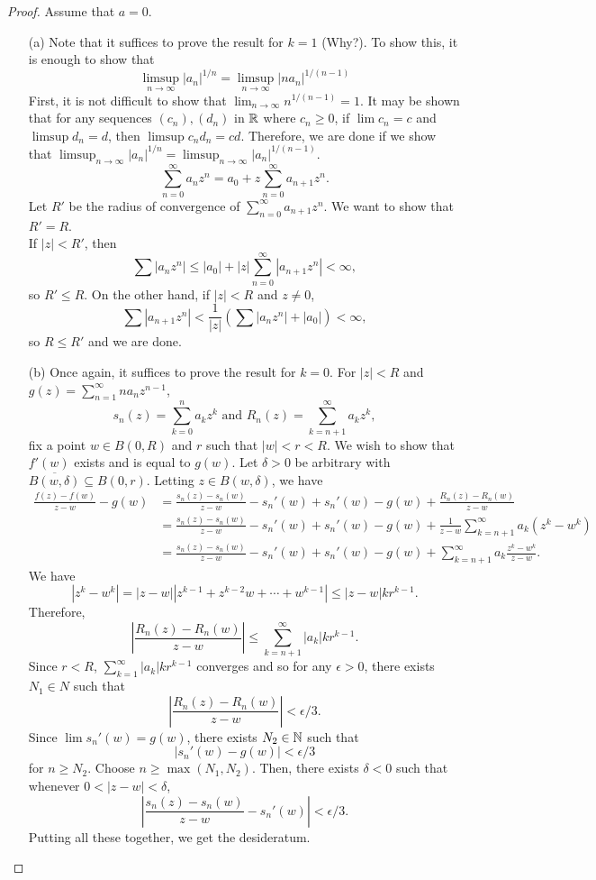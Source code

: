 	\begin{proof}
		Assume that $a = 0$.
		\begin{itemize}
			\item[(a)] Note that it suffices to prove the result for $k = 1$ (Why?). To show this, it is enough to show that
			\[ \limsup_{n\to\infty} |a_n|^{1/n} = \limsup_{n\to\infty} |na_n|^{1/(n-1)} \]
			First, it is not difficult to show that $\lim_{n\to\infty} n^{1/(n-1)} = 1$. It may be shown that for any sequences $(c_n),(d_n)$ in $\mathbb{R}$ where $c_n \ge 0$, if $\lim c_n = c$ and $\limsup d_n = d$, then $\limsup c_n d_n = cd$. Therefore, we are done if we show that $\limsup_{n\to\infty} |a_n|^{1/n} = \limsup_{n\to\infty} |a_n|^{1/(n-1)}$.
			\[ \sum_{n=0}^\infty a_n z^n = a_0 + z\sum_{n=0}^\infty a_{n+1} z^n. \]
			Let $R'$  be the radius of convergence of $\sum_{n=0}^\infty a_{n+1} z^n$. We want to show that $R' = R$. \\
			If $|z| < R'$, then 
			\[ \sum |a_n z^n| \le |a_0| + |z| \sum_{n=0}^\infty |a_{n+1} z^n| < \infty, \]
			so $R' \le R$. On the other hand, if $|z| < R$ and $z \ne 0$,
			\[ \sum |a_{n+1} z^n| < \frac{1}{|z|} \left(\sum |a_n z^n| + |a_0|\right) < \infty, \]
			so $R \le R'$ and we are done.

			\item[(b)] Once again, it suffices to prove the result for $k = 0$. For $|z| < R$ and $g(z) = \sum_{n=1}^\infty n a_n z^{n-1}$,
			\[ s_n(z) = \sum_{k=0}^n a_k z^k \text{ and } R_n(z) = \sum_{k=n+1}^\infty a_k z^k, \]
			fix a point $w \in B(0,R)$ and $r$ such that $|w| < r < R$. We wish to show that $f'(w)$ exists and is equal to $g(w)$. Let $\delta > 0$ be arbitrary with $\overline{B(w,\delta)} \subseteq B(0,r)$. Letting $z \in B(w,\delta)$, we have
			\begin{align*}
				\frac{f(z)-f(w)}{z-w} - g(w) &= \frac{s_n(z)-s_n(w)}{z-w} - s_n'(w) + s_n'(w) - g(w) + \frac{R_n(z) - R_n(w)}{z-w} \\
					&= \frac{s_n(z)-s_n(w)}{z-w} - s_n'(w) + s_n'(w) - g(w) + \frac{1}{z-w} \sum_{k=n+1}^\infty a_k (z^k - w^k) \\
					&= \frac{s_n(z)-s_n(w)}{z-w} - s_n'(w) + s_n'(w) - g(w) + \sum_{k=n+1}^\infty a_k \frac{z^k - w^k}{z-w}.
			\end{align*}
			We have
			\[ |z^k - w^k| = |z-w||z^{k-1} + z^{k-2}w + \cdots + w^{k-1}| \le |z-w| kr^{k-1}. \]
			Therefore,
			\[ \left| \frac{R_n(z) - R_n(w)}{z-w} \right| \le \sum_{k=n+1}^\infty |a_k| k r^{k-1}. \]
			Since $r < R$, $\sum_{k=1}^\infty |a_k| k r^{k-1}$ converges and so for any $\epsilon > 0$, there exists $N_1 \in N$ such that
			\[ \left| \frac{R_n(z) - R_n(w)}{z-w} \right| < \epsilon/3. \]
			Since $\lim s_n'(w) = g(w)$, there exists $N_2 \in \mathbb{N}$ such that
			\[ |s_n'(w) - g(w)| < \epsilon/3 \]
			for $n \ge N_2$. Choose $n \ge \max(N_1, N_2)$. Then, there exists $\delta < 0$ such that whenever $0 < |z-w| < \delta$,
			\[ \left| \frac{s_n(z) - s_n(w)}{z-w} - s_n'(w) \right| < \epsilon/3. \]
			Putting all these together, we get the desideratum.


\end{itemize}
\end{proof}
